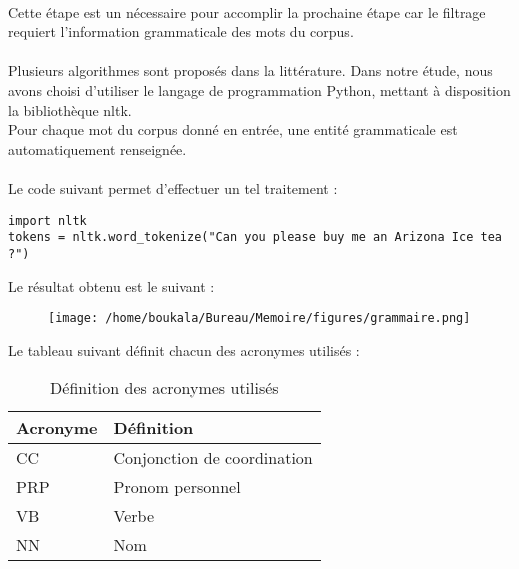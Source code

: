 \documentclass[12pt, a4paper, oneside]{book}
\begin{document}
\paragraph{}
Cette étape est un nécessaire pour accomplir la prochaine étape car le filtrage requiert l'information grammaticale des mots du corpus.
\paragraph{}
Plusieurs algorithmes sont proposés dans la littérature. Dans notre étude, nous avons choisi d'utiliser le langage de programmation Python, mettant à disposition la bibliothèque nltk.\\
Pour chaque mot du corpus donné en entrée, une entité grammaticale est automatiquement renseignée. \\ \\
Le code suivant permet d'effectuer un tel traitement : 
\begin{verbatim}
import nltk
tokens = nltk.word_tokenize("Can you please buy me an Arizona Ice tea ?")
\end{verbatim}

Le résultat obtenu est le suivant : 

\begin{figure}[h!]
\begin{center}
\texttt{[image: /home/boukala/Bureau/Memoire/figures/grammaire.png]}
\end{center}
\end{figure}

Le tableau suivant définit chacun des acronymes utilisés : 
\\

\begin{table}[h!]
\centering
\begin{tabular}{| l | l |}
 \hline
 Acronyme & Définition \\
 \hline
 CC & Conjonction de coordination \\
 \hline
 PRP & Pronom personnel \\
 \hline
 VB & Verbe \\
 \hline
 NN & Nom \\
 \hline
\end{tabular}
\caption{Définition des acronymes utilisés}
\end{table}
\end{document}
